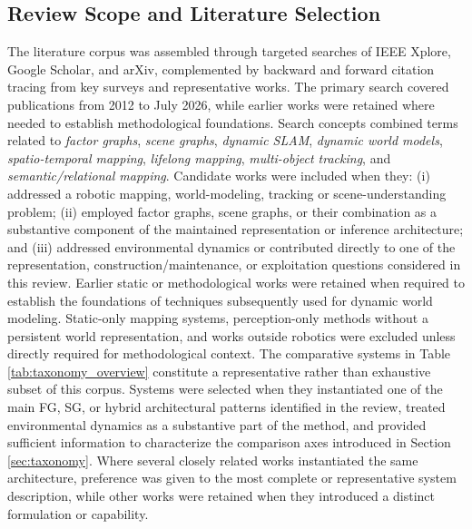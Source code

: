 \subsection{Review Scope and Literature Selection}
The literature corpus was assembled through targeted searches of IEEE Xplore, Google Scholar, and arXiv, complemented by backward and forward citation tracing from key surveys and representative works.
The primary search covered publications from 2012 to July 2026, while earlier works were retained where needed to establish methodological foundations.
Search concepts combined terms related to \textit{factor graphs}, \textit{scene graphs}, \textit{dynamic SLAM}, \textit{dynamic world models}, \textit{spatio-temporal mapping}, \textit{lifelong mapping}, \textit{multi-object tracking}, and \textit{semantic/relational mapping}.
Candidate works were included when they: (i) addressed a robotic mapping, world-modeling, tracking or scene-understanding problem; (ii) employed factor graphs, scene graphs, or their combination as a substantive component of the maintained representation or inference architecture; and (iii) addressed environmental dynamics or contributed directly to one of the representation, construction/maintenance, or exploitation questions considered in this review.
Earlier static or methodological works were retained when required to establish the foundations of techniques subsequently used for dynamic world modeling.
Static-only mapping systems, perception-only methods without a persistent world representation, and works outside robotics were excluded unless directly required for methodological context.
The comparative systems in Table \ref{tab:taxonomy_overview} constitute a representative rather than exhaustive subset of this corpus. 
Systems were selected when they instantiated one of the main FG, SG, or hybrid architectural patterns identified in the review, treated environmental dynamics as a substantive part of the method, and provided sufficient information to characterize the comparison axes introduced in Section \ref{sec:taxonomy}. Where several closely related works instantiated the same architecture, preference was given to the most complete or representative system description, while other works were retained when they introduced a distinct formulation or capability.

